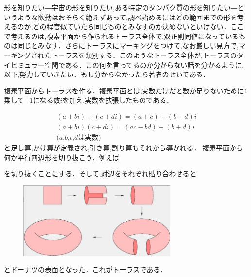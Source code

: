 


形を知りたい―宇宙の形を知りたい,ある特定のタンパク質の形を知りたい―というような欲動はおそらく絶えずあって,調べ始めるにはどの範囲までの形を考えるのか,どの程度似ていたら同じものとみなすのか決めないといけない．ここで考えるのは,複素平面から作られるトーラス全体で,双正則同値になっているものは同じとみなす．さらにトーラスにマーキングをつけて,なお厳しい見方で,マーキングされたトーラスを類別する．このようなトーラス全体が,トーラスのタイヒミュラー空間である．この何を言ってるのか分からない話を分かるように,以下,努力していきたい．もし分からなかったら著者のせいである．

複素平面からトーラスを作る．複素平面とは,実数だけだと数が足りないために$1$乗して$-1$になる数$i$を加え,実数を拡張したものである．
\begin{figure} 
\end{figure}
\begin{gather*}
(a+bi)+(c+di)=(a+c)+(b+d)i \\
(a+bi)(c+di)=(ac-bd)+(b+d)i \\
\text{($a$,$b$,$c$,$d$は実数)}
\end{gather*}
と足し算,かけ算が定義され,引き算,割り算もそれから導かれる．
複素平面から何か平行四辺形を切り抜こう．例えば\\

を切り抜くことにする．そして,対辺をそれぞれ貼り合わせると
\\
\begin{figure}[h]
\includegraphics[width=8cm,bb=0 0 452 217]{asaka3.png}
\end{figure}
とドーナツの表面となった．これがトーラスである．

